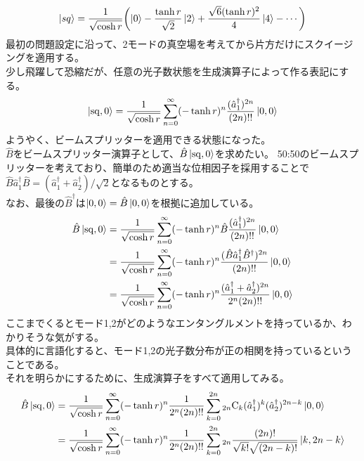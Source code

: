 \documentclass{jsarticle}
\begin{document}
\begin{gather*}
	\ket{sq} = \frac{1}{\sqrt{\cosh r}} \qty( \ket{0} - \frac{\tanh r}{\sqrt{2}} \ket{2} + \frac{\sqrt{6} (\tanh r)^2}{4} \ket{4} - \cdots )
\end{gather*}
最初の問題設定に沿って、2モードの真空場を考えてから片方だけにスクイージングを適用する。\\
少し飛躍して恐縮だが、任意の光子数状態を生成演算子によって作る表記にする。
\begin{gather*}
	\ket{\mathrm{sq}, 0} =  \frac{1}{\sqrt{\cosh r}} \sum^{\infty}_{n=0} (- \tanh r)^n \frac{(\hat{a}^{\dagger}_{1})^{2n}}{(2n)!!} \ket{0,0}
\end{gather*}
ようやく、ビームスプリッターを適用できる状態になった。\\
$\hat{B}$をビームスプリッター演算子として、$\hat{B} \ket{\mathrm{sq}, 0}$を求めたい。
50:50のビームスプリッターを考えており、簡単のため適当な位相因子を採用することで$\hat{B} \hat{a}^\dagger_1 \hat{B} = (\hat{a}^\dagger_1 + \hat{a}^\dagger_2)/\sqrt{2}$となるものとする。\\
なお、最後の$\hat{B}^\dagger$は$\ket{0,0} = \hat{B} \ket{0,0}$を根拠に追加している。
\begin{align*}
	\hat{B} \ket{\mathrm{sq}, 0} 	&= \frac{1}{\sqrt{\cosh r}} \sum^{\infty}_{n=0} (- \tanh r)^n \hat{B} \frac{(\hat{a}^{\dagger}_{1})^{2n}}{(2n)!!} \ket{0,0}\\
									&= \frac{1}{\sqrt{\cosh r}} \sum^{\infty}_{n=0} (- \tanh r)^n  \frac{( \hat{B} \hat{a}^{\dagger}_{1} \hat{B}^\dagger )^{2n}}{(2n)!!} \ket{0,0}\\
									&= \frac{1}{\sqrt{\cosh r}} \sum^{\infty}_{n=0} (- \tanh r)^n  \frac{(  \hat{a}^\dagger_1 + \hat{a}^\dagger_2  )^{2n}}{2^n (2n)!!} \ket{0,0}
\end{align*}
ここまでくるとモード1,2がどのようなエンタングルメントを持っているか、わかりそうな気がする。\\
具体的に言語化すると、モード1,2の光子数分布が正の相関を持っているということである。\\
それを明らかにするために、生成演算子をすべて適用してみる。
\begin{align*}
	\hat{B} \ket{\mathrm{sq}, 0} 	&= \frac{1}{\sqrt{\cosh r}} \sum^{\infty}_{n=0} (- \tanh r)^n \frac{1}{2^n (2n)!!} \sum^{2n}_{k=0} {}_{2n} \mathrm{C}_k (\hat{a}^\dagger_1)^k (\hat{a}^\dagger_2)^{2n-k}  \ket{0,0}\\
									&= \frac{1}{\sqrt{\cosh r}} \sum^{\infty}_{n=0} (- \tanh r)^n \frac{1}{2^n (2n)!!} \sum^{2n}_{k=0} {}_{2n} \frac{(2n)!}{\sqrt{k!} \sqrt{(2n-k)!}} \ket{k,2n-k}
\end{align*}
\end{document}
